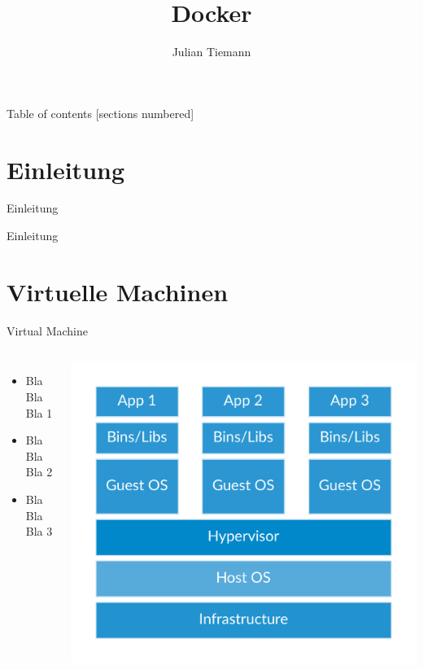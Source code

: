 \documentclass[10pt]{beamer}
\title{Docker}
\date{}
\author{Julian Tiemann}
\institute{Universität Hamburg}
\begin{document}
\maketitle

\begin{frame}{Table of contents}
  [sections numbered]
  \tableofcontents[hideallsubsections]
\end{frame}

\section{Einleitung}

\begin{frame}[fragile]{Einleitung}

  Einleitung

\end{frame}

\section{Virtuelle Machinen}

\begin{frame}[fragile]{Virtual Machine}
  \begin{columns}[T,onlytextwidth]
      \begin{itemize}
        \item Bla Bla Bla 1
        \item Bla Bla Bla 2
        \item Bla Bla Bla 3
      \end{itemize}
      \includegraphics[width=1\textwidth]{../images/1-docker-vm.png}
  \end{columns}
\end{frame}
\end{document}
